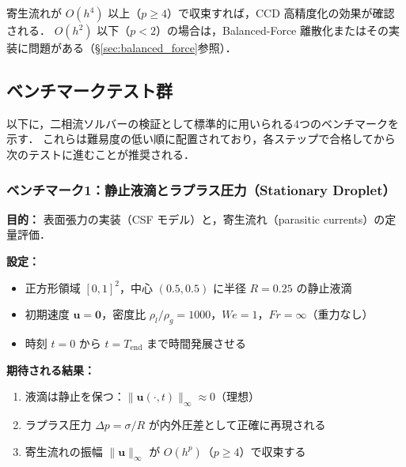 寄生流れが $O(h^4)$ 以上（$p \ge 4$）で収束すれば，CCD 高精度化の効果が確認される．
$O(h^2)$ 以下（$p < 2$）の場合は，Balanced-Force 離散化またはその実装に問題がある（§\ref{sec:balanced_force}参照）．

\subsection{ベンチマークテスト群}
\label{sec:benchmarks}

以下に，二相流ソルバーの検証として標準的に用いられる4つのベンチマークを示す．
これらは難易度の低い順に配置されており，各ステップで合格してから
次のテストに進むことが推奨される．

\subsubsection{ベンチマーク1：静止液滴とラプラス圧力（Stationary Droplet）}
\label{sec:bench_droplet}

\textbf{目的：} 表面張力の実装（CSF モデル）と，寄生流れ（parasitic currents）の定量評価．

\textbf{設定：}
\begin{itemize}
  \item 正方形領域 $[0,1]^2$，中心 $(0.5, 0.5)$ に半径 $R=0.25$ の静止液滴
  \item 初期速度 $\bm{u} = \bm{0}$，密度比 $\rho_l/\rho_g = 1000$，$We = 1$，$Fr = \infty$（重力なし）
  \item 時刻 $t = 0$ から $t = T_{\text{end}}$ まで時間発展させる
\end{itemize}

\textbf{期待される結果：}
\begin{enumerate}
  \item 液滴は静止を保つ：$\|\bm{u}(\cdot, t)\|_\infty \approx 0$（理想）
  \item ラプラス圧力 $\Delta p = \sigma/R$ が内外圧差として正確に再現される
  \item 寄生流れの振幅 $\|\bm{u}\|_\infty$ が $O(h^p)$（$p \ge 4$）で収束する
\end{enumerate}

